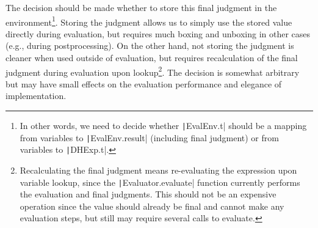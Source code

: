 The decision should be made whether to store this \textsf{final} judgment in the environment\footnote{In other words, we need to decide whether \texttt|EvalEnv.t| should be a mapping from variables to \texttt|EvalEnv.result| (including \textsf{final} judgment) or from variables to \texttt|DHExp.t|.}. Storing the judgment allows us to simply use the stored value directly during evaluation, but requires much boxing and unboxing in other cases (e.g., during postprocessing). On the other hand, not storing the judgment is cleaner when used outside of evaluation, but requires recalculation of the \textsf{final} judgment during evaluation upon lookup\footnote{Recalculating the \textsf{final} judgment means re-evaluating the expression upon variable lookup, since the \texttt|Evaluator.evaluate| function currently performs the evaluation and \textsf{final} judgments. This should not be an expensive operation since the value should already be final and cannot make any evaluation steps, but still may require several calls to evaluate.}. The decision is somewhat arbitrary but may have small effects on the evaluation performance and elegance of implementation.

